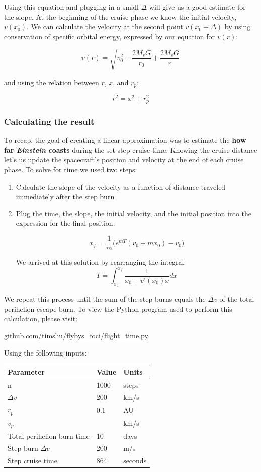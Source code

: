 \documentclass[12pt]{article} %
\begin{document}
Using this equation and plugging in a small $\Delta$ will give us a good estimate for the slope. At the beginning of the cruise phase we know the initial velocity, $v(x_0)$. We can calculate the velocity at the second point $v(x_0 + \Delta)$ by using conservation of specific orbital energy, expressed by our equation for $v(r)$:

$$v(r) = \sqrt{v_0^2-\frac{2M_sG}{r_0} + \frac{2M_sG}{r}}$$

and using the relation between $r$, $x$, and $r_p$:

$$r^2 = x^2 + r_p^2$$


\subsubsection{Calculating the result}
To recap, the goal of creating a linear approximation was to estimate the \textbf{how far \textit{Einstein} coasts} during the set step cruise time. Knowing the cruise distance let's us update the spacecraft's position and velocity at the end of each cruise  phase. To solve for time we used two steps:
\begin{enumerate}
\item Calculate the slope of the velocity as a function of distance traveled immediately after the step burn
\item Plug the time, the slope, the initial velocity, and the initial position into the expression for the final position:

$$\boxed{x_f = \frac{1}{m}\bigg(e^{mT}(v_0+mx_0) - v_0\bigg)}$$

We arrived at this solution by rearranging the integral:
$$\boxed{T = \int_{x_0}^{x_f} \frac{1}{x_0+v'(x_0)x} dx}$$
\end{enumerate}

We repeat this process until the sum of the step burns equals the $\Delta v$ of the total perihelion escape burn. To view the Python program used to perform this calculation, please visit:

\url{github.com/timsliu/flybys_foci/flight_time.py}

Using the following inputs:

\begin{center}
\begin{tabular}{|m{5 cm}| m{5 cm}| m{5 cm}|} \hline
\textbf{Parameter} & \textbf{Value} & \textbf{Units}\\ \hline
n & 1000& steps\\ \hline
$\Delta v$ & 200& km/s \\ \hline
$r_p$      &  0.1& AU\\ \hline
$v_p$     &  & km/s\\ \hline
Total perihelion burn time & 10 & days \\ \hline
Step burn $\Delta v$ & 200 & m/s\\ \hline
Step cruise time & 864& seconds \\ \hline
\end{tabular}
\end{center}
\end{document}
